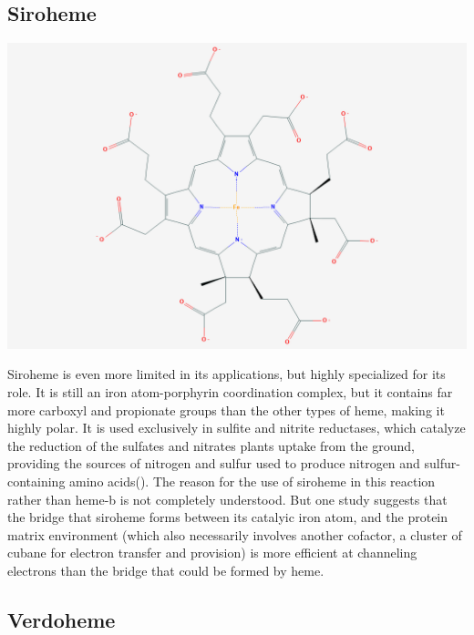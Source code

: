 \documentclass[a4paper, nobind]{templates/ociamthesis}
\let\origfigure\figure
\let\endorigfigure\endfigure
\renewenvironment{figure}[1][2] {
    \expandafter\origfigure\expandafter[H]
} {
    \endorigfigure
}
\begin{document}
\hypertarget{siroheme}{%
\subsection{Siroheme}\label{siroheme}}

\begin{figure}

{\centering \includegraphics[width=0.5\linewidth]{figures/SRM} 

}

\caption{Siroheme (SRM)}\label{fig:structSRM}
\end{figure}

Siroheme is even more limited in its applications, but highly specialized for its role. It is still an iron atom-porphyrin coordination complex, but it contains far more carboxyl and propionate groups than the other types of heme, making it highly polar. It is used exclusively in sulfite and nitrite reductases, which catalyze the reduction of the sulfates and nitrates plants uptake from the ground, providing the sources of nitrogen and sulfur used to produce nitrogen and sulfur-containing amino acids(\textcite{Tripathy2010}). The reason for the use of siroheme in this reaction rather than heme-b is not completely understood. But one study suggests that the bridge that siroheme forms between its catalyic iron atom, and the protein matrix environment (which also necessarily involves another cofactor, a cluster of cubane for electron transfer and provision) is more efficient at channeling electrons than the bridge that could be formed by heme.\autocite{Branzanic2019}

\hypertarget{verdoheme}{%
\subsection{Verdoheme}\label{verdoheme}}
\end{document}
